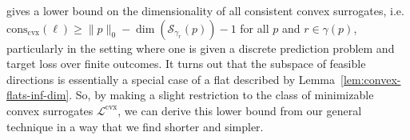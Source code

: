 \documentclass[anon,12pt]{colt2021} %
\newcommand{\Comments}{1}
\newcommand{\mynote}[2]{\ifnum\Comments=1\textcolor{#1}{#2}\fi}
\newcommand{\jessie}[1]{\mynote{purple}{[JF: #1]}}
\newcommand{\reals}{\mathbb{R}}
\newcommand{\conscvx}{\mathrm{cons}_\mathrm{cvx}}
\newcommand{\rank}{\mathrm{rank}}
\newcommand{\zeros}[1]{\mathrm{ker}_\P\,#1}
\newcommand{\codim}{\mathrm{codim}}
\newcommand{\Pcodim}{\mathcal{P}\!\text{-}\mathrm{codim}}
\newcommand{\E}{\mathbb{E}}
\newcommand{\Lcvx}{\mathcal{L}^{\mathrm{cvx}}}
\newcommand{\R}{\mathcal{R}}
\renewcommand{\P}{\mathcal{P}}
\newcommand{\Sc}{\mathcal{S}}  %
\newcommand{\Y}{\mathcal{Y}}
\newcommand{\toto}{\rightrightarrows}
\begin{document}
\citet{ramaswamy2016convex} gives a lower bound on the dimensionality of all consistent convex surrogates, i.e. $\conscvx(\ell) \geq \|p\|_0 - \dim(\Sc_{\gamma_r}(p)) - 1$ for all $p$ and $r \in \gamma(p)$, particularly in the setting where one is given a discrete prediction problem and target loss over finite outcomes.
It turns out that the subspace of feasible directions is essentially a special case of a flat described by Lemma~\ref{lem:convex-flats-inf-dim}.
So, by making a slight restriction to the class of minimizable convex surrogates $\Lcvx$, we can derive this lower bound from our general technique in a way that we find shorter and simpler.

%	
\end{document}
